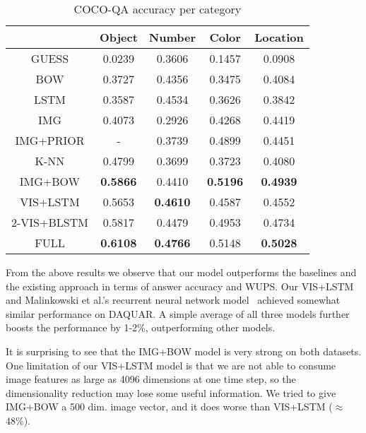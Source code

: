 \documentclass{article} \usepackage{nips15submit_e,times}
\renewcommand{\#}[1]{\textbf{#1}}
\begin{document}
\begin{table}[h]
\caption{COCO-QA accuracy per category}
\label{tab:cocoqa_acc_breakdown}
\begin{center}
\begin{small}
\begin{sc}
\begin{tabular}{c c c c c}
\hline
           &   Object  &   Number &   Color   & Location \\
\hline
GUESS      &   0.0239  &   0.3606 &   0.1457  & 0.0908   \\
BOW        &   0.3727  &   0.4356 &   0.3475  & 0.4084   \\
LSTM       &   0.3587  &   0.4534 &   0.3626  & 0.3842   \\
IMG        &   0.4073  &   0.2926 &   0.4268  & 0.4419   \\
IMG+PRIOR  &   -       &   0.3739 &   0.4899  & 0.4451   \\
K-NN       &   0.4799  &   0.3699 &   0.3723  & 0.4080   \\
IMG+BOW    &\#{0.5866} &   0.4410 &\#{0.5196} &\#{0.4939}\\
VIS+LSTM   &   0.5653  &\#{0.4610}&   0.4587  & 0.4552   \\
2-VIS+BLSTM&   0.5817  &   0.4479 &   0.4953  & 0.4734   \\
FULL       &\#{0.6108} &\#{0.4766}&   0.5148  &\#{0.5028}\\
\hline
\end{tabular}
\end{sc}
\end{small}
\end{center}
\end{table}

From the above results we observe that our model outperforms the baselines and
the existing approach in terms of answer accuracy and WUPS. Our VIS+LSTM and
Malinkowski et al.'s recurrent neural network model~\cite{malinowski15} achieved
somewhat similar performance on DAQUAR. A simple average of all three models
further boosts the performance by 1-2\%, outperforming other models.

It is surprising to see that the IMG+BOW model is very strong on both datasets. One
limitation of our VIS+LSTM model is that we are not able to consume image
features as large as 4096 dimensions at one time step, so the dimensionality
reduction may lose some useful information. We tried to give IMG+BOW a 500 dim.
image vector, and it does worse than VIS+LSTM ($\approx$48\%). 
\end{document}
